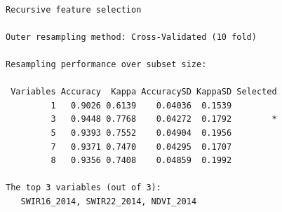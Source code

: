 \documentclass[
]{article}
\newenvironment{Shaded}{\begin{snugshade}}{\end{snugshade}}
\newcommand{\FunctionTok}[1]{\textcolor[rgb]{0.13,0.29,0.53}{\textbf{#1}}}
\newcommand{\NormalTok}[1]{#1}
\newcommand{\SpecialCharTok}[1]{\textcolor[rgb]{0.81,0.36,0.00}{\textbf{#1}}}
\begin{document}
\begin{verbatim}

Recursive feature selection

Outer resampling method: Cross-Validated (10 fold) 

Resampling performance over subset size:

 Variables Accuracy  Kappa AccuracySD KappaSD Selected
         1   0.9026 0.6139    0.04036  0.1539         
         3   0.9448 0.7768    0.04272  0.1792        *
         5   0.9393 0.7552    0.04904  0.1956         
         7   0.9371 0.7470    0.04295  0.1707         
         8   0.9356 0.7408    0.04859  0.1992         

The top 3 variables (out of 3):
   SWIR16_2014, SWIR22_2014, NDVI_2014
\end{verbatim}

\begin{Shaded}
\end{Shaded}
\end{document}
